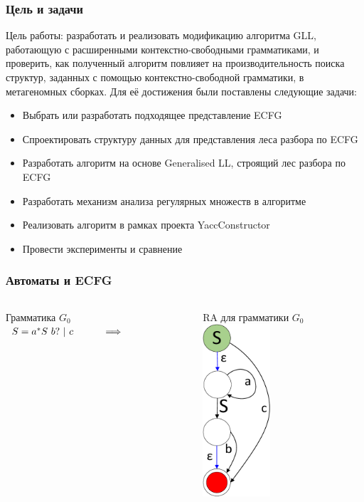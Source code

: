 \documentclass{beamer}
\begin{document}
	\begin{frame} 
		\frametitle{Цель и задачи}
		Цель работы: разработать и реализовать модификацию алгоритма GLL, работающую с расширенными контекстно-свободными грамматиками, и проверить, как полученный алгоритм повлияет на производительность поиска структур, заданных с помощью контекстно-свободной грамматики, в метагеномных сборках.
		Для её достижения были поставлены следующие задачи:
		\begin{itemize}
			\item Выбрать или разработать подходящее представление ECFG
			\item Спроектировать структуру данных для представления леса разбора по ECFG
			\item Разработать алгоритм на основе Generalised LL, строящий лес разбора по ECFG
            \item Разработать механизм анализа регулярных множеств в алгоритме
			\item Реализовать алгоритм в рамках проекта YaccConstructor
			\item Провести эксперименты и сравнение
		\end{itemize}
	\end{frame}

	\begin{frame} 
		\frametitle{Автоматы и ECFG}
		
		\begin{columns}
			\begin{column}{4cm}
				Грамматика $G_0$\\
				\vspace{10pt}
				$
				\begin{array}[b]{rl}
				S = a^{*} S\ b? \ | \ c \ \ \ \ \ \ \ \ \  \Longrightarrow
				\end{array}
				$
			\end{column}
			\begin{column}{3.3cm}
				RA для грамматики $G_0$\\
				\vspace{10pt}
				\includegraphics[width=2.5cm]{pictures/G0initialAutomaton.pdf}
			\end{column}
		\end{columns}
	\end{frame}
\end{document}
